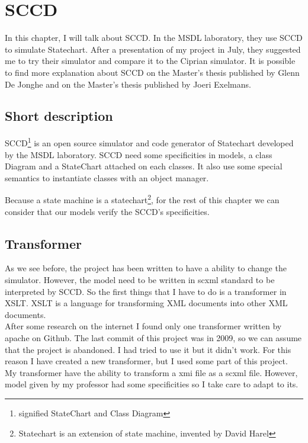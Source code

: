 
\chapter{SCCD}
\label{chap:sccd}

In this chapter, I will talk about SCCD. In the MSDL laboratory, they use SCCD to simulate Statechart. After a presentation of my project in July, they suggested me to try their simulator and compare it to the Ciprian simulator. It is possible to find more explanation about SCCD on the Master's thesis published by Glenn De Jonghe\cite{sccd} and on the Master's thesis published by Joeri Exelmans\cite{sccd2}.

\section{Short description}

SCCD\footnote{signified StateChart and Class Diagram} is an open source simulator and code generator of Statechart developed by the MSDL laboratory. SCCD need some specificities in models, a class Diagram and a StateChart attached on each classes. It also use some special semantics to instantiate classes with an object manager.

Because a state machine is a statechart\footnote{Statechart is an extension of state machine, invented by David Harel}, for the rest of this chapter we can consider that our models verify the SCCD's specificities.


\section{Transformer}

As we see before, the project has been written to have a ability to change the simulator. However, the model need to be written in scxml standard to be interpreted by SCCD. So the first things that I have to do is a transformer in XSLT. XSLT is a language for transforming XML documents into other XML documents.
~\\

After some research on the internet I found only one transformer written by apache on Github\cite{apache}. The last commit of this project was in 2009, so we can assume that the project is abandoned. I had tried to use it but it didn't work. For this reason I have created a new transformer, but I used some part of this project.
~\\

My transformer have the ability to transform a xmi file as a scxml file. However, model given by my professor had some specificities so I take care to adapt to its.


